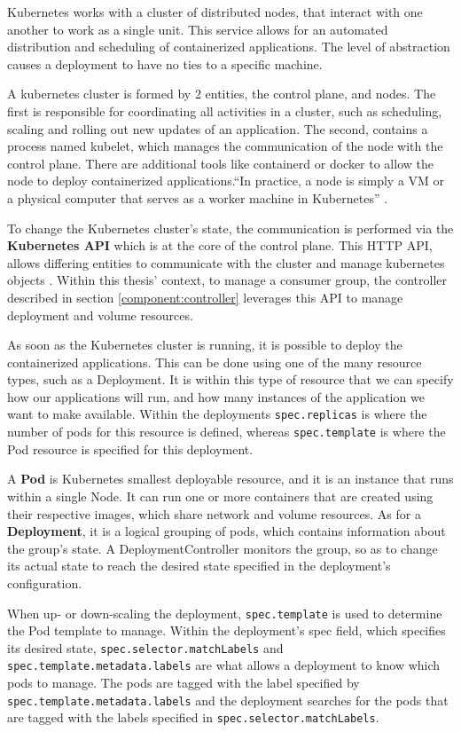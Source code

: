 Kubernetes works with a cluster of distributed nodes, that interact with one
another to work as a single unit. This service allows for an automated
distribution and scheduling of containerized applications. The level of
abstraction causes a deployment to have no ties to a specific machine.

A kubernetes cluster is formed by 2 entities, the control plane, and nodes. The
first is responsible for coordinating all activities in a cluster, such as
scheduling, scaling and rolling out new updates of an application. The second,
contains a process named kubelet, which manages the communication of the node
with the control plane. There are additional tools like containerd or docker to
allow the node to deploy containerized applications.``In practice, a node is
simply a VM or a physical computer that serves as a worker machine in
Kubernetes'' \cite{CreateKubeCluster}.

To change the Kubernetes cluster's state, the communication is performed via the
\textbf{Kubernetes API} which is at the core of the control plane. This HTTP
API, allows differing entities to communicate with the cluster and manage
kubernetes objects \cite{KubernetesAPI}. Within this thesis' context, to manage
a consumer group, the controller described in section \ref{component:controller}
leverages this API to manage deployment and volume resources.

As soon as the Kubernetes cluster is running, it is possible to deploy the
containerized applications. This can be done using one of the many resource
types, such as a Deployment. It is within this type of resource that we can
specify how our applications will run, and how many instances of the application
we want to make available. Within the deployments \lstinline{spec.replicas} is
where the number of pods for this resource is defined, whereas
\lstinline{spec.template} is where the Pod resource is specified for this
deployment. 

A \textbf{Pod} is Kubernetes smallest deployable resource, and it is
an instance that runs within a single Node. It can run one or more containers
that are created using their respective images, which share network and volume
resources. As for a \textbf{Deployment}, it is a logical grouping of pods, which
contains information about the group's state. A DeploymentController monitors
the group, so as to change its actual state to reach the desired state specified
in the deployment's configuration.

\begin{sloppypar}
When up- or down-scaling the deployment, \lstinline{spec.template} is used to
determine the Pod template to manage. Within the deployment's spec field, which
specifies its desired state, \lstinline{spec.selector.matchLabels} and
\lstinline{spec.template.metadata.labels} are what allows a deployment to know
which pods to manage. The pods are tagged with the label specified by
\lstinline{spec.template.metadata.labels} and the deployment searches for the
pods that are tagged with the labels specified in
\lstinline{spec.selector.matchLabels}.
\end{sloppypar}

